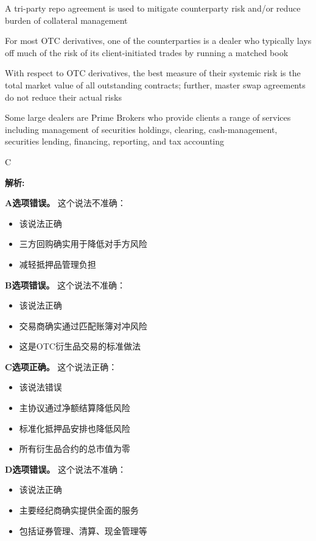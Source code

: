 \documentclass{article}
\newenvironment{explanation}
{\textbf{解析:}\par}
{\par}
\begin{document}
\begin{choices}
    \item A tri-party repo agreement is used to mitigate counterparty risk and/or reduce burden of collateral management
    \item For most OTC derivatives, one of the counterparties is a dealer who typically lays off much of the risk of its client-initiated trades by running a matched book
    \item With respect to OTC derivatives, the best measure of their systemic risk is the total market value of all outstanding contracts; further, master swap agreements do not reduce their actual risks
    \item Some large dealers are Prime Brokers who provide clients a range of services including management of securities holdings, clearing, cash-management, securities lending, financing, reporting, and tax accounting
\end{choices}

\begin{correctanswer}
    C
\end{correctanswer}

\begin{explanation}
    \textbf{A选项错误。}
    这个说法不准确：
    \begin{itemize}
        \item 该说法正确
        \item 三方回购确实用于降低对手方风险
        \item 减轻抵押品管理负担
    \end{itemize}

    \textbf{B选项错误。}
    这个说法不准确：
    \begin{itemize}
        \item 该说法正确
        \item 交易商确实通过匹配账簿对冲风险
        \item 这是OTC衍生品交易的标准做法
    \end{itemize}

    \textbf{C选项正确。}
    这个说法正确：
    \begin{itemize}
        \item 该说法错误
        \item 主协议通过净额结算降低风险
        \item 标准化抵押品安排也降低风险
        \item 所有衍生品合约的总市值为零
    \end{itemize}

    \textbf{D选项错误。}
    这个说法不准确：
    \begin{itemize}
        \item 该说法正确
        \item 主要经纪商确实提供全面的服务
        \item 包括证券管理、清算、现金管理等
    \end{itemize}
\end{explanation}
\end{document}
